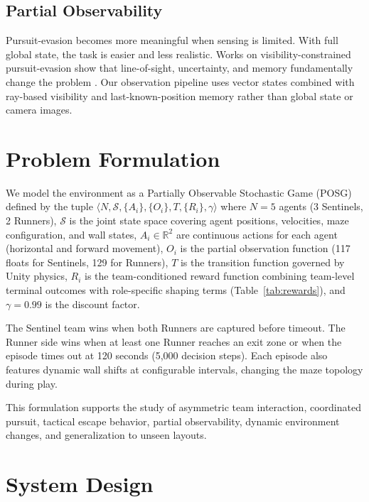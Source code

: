 \documentclass[conference]{IEEEtran}
\begin{document}
\subsection{Partial Observability}

Pursuit-evasion becomes more meaningful when sensing is limited. With full global state, the task is easier and less realistic. Works on visibility-constrained pursuit-evasion show that line-of-sight, uncertainty, and memory fundamentally change the problem \cite{viper2025,gonultas2024,matrixworld2023}. Our observation pipeline uses vector states combined with ray-based visibility and last-known-position memory rather than global state or camera images.

\section{Problem Formulation}

We model the environment as a Partially Observable Stochastic Game (POSG) defined by the tuple $\langle N, \mathcal{S}, \{A_i\}, \{O_i\}, T, \{R_i\}, \gamma \rangle$ where $N{=}5$ agents (3 Sentinels, 2 Runners), $\mathcal{S}$ is the joint state space covering agent positions, velocities, maze configuration, and wall states, $A_i \in \mathbb{R}^2$ are continuous actions for each agent (horizontal and forward movement), $O_i$ is the partial observation function (117 floats for Sentinels, 129 for Runners), $T$ is the transition function governed by Unity physics, $R_i$ is the team-conditioned reward function combining team-level terminal outcomes with role-specific shaping terms (Table~\ref{tab:rewards}), and $\gamma{=}0.99$ is the discount factor.

The Sentinel team wins when both Runners are captured before timeout. The Runner side wins when at least one Runner reaches an exit zone or when the episode times out at 120 seconds (5,000 decision steps). Each episode also features dynamic wall shifts at configurable intervals, changing the maze topology during play.

This formulation supports the study of asymmetric team interaction, coordinated pursuit, tactical escape behavior, partial observability, dynamic environment changes, and generalization to unseen layouts.

\section{System Design}
\end{document}
